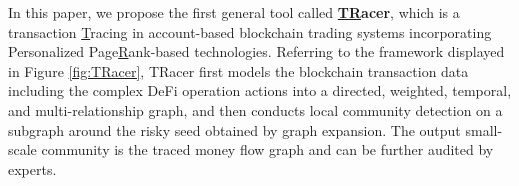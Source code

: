 In this paper, we propose the first general tool called \textbf{\underline{T}\underline{R}acer}, which is a transaction \underline{T}racing in account-based blockchain trading systems incorporating Personalized Page\underline{R}ank-based technologies. Referring to the framework displayed in Figure \ref{fig:TRacer}, TRacer first models the blockchain transaction data including the complex DeFi operation actions into a directed, weighted, temporal, and multi-relationship graph, and then conducts local community detection on a subgraph around the risky seed obtained by graph expansion. The output small-scale community is the traced money flow graph and can be further audited by experts.
